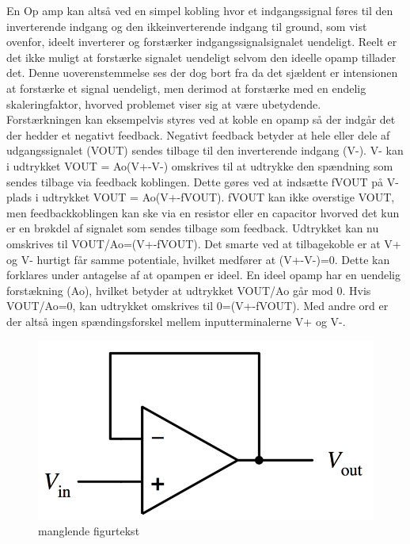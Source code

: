 %
En Op amp kan altså ved en simpel kobling hvor et indgangssignal føres til den inverterende indgang og den ikkeinverterende indgang til ground, som vist ovenfor, ideelt inverterer og forstærker indgangssignalsignalet uendeligt. Reelt er det ikke muligt at forstærke signalet uendeligt selvom den ideelle opamp tillader det. Denne uoverenstemmelse ses der dog bort fra da det sjældent er intensionen at forstærke et  signal uendeligt, men derimod at forstærke med en endelig skaleringfaktor, hvorved problemet viser sig at være ubetydende.\\
%
Forstærkningen kan eksempelvis styres ved at koble en opamp så der indgår det der hedder et negativt feedback. Negativt feedback betyder at hele eller dele af udgangssignalet (VOUT) sendes tilbage til den inverterende indgang (V-). V- kan i udtrykket VOUT = Ao(V+-V-) omskrives til at udtrykke den spændning som sendes tilbage via feedback koblingen. Dette gøres ved at indsætte fVOUT på V- plads i udtrykket VOUT = Ao(V+-fVOUT). fVOUT  kan ikke overstige VOUT, men feedbackkoblingen kan ske via en resistor eller en capacitor hvorved det kun er en brøkdel af signalet som sendes tilbage som feedback. Udtrykket kan nu omskrives til VOUT/Ao=(V+-fVOUT). Det smarte ved at tilbagekoble er at V+ og V- hurtigt får samme potentiale, hvilket medfører at (V+-V-)=0. Dette kan forklares under antagelse af at opampen er ideel. En ideel opamp har en uendelig forstækning (Ao), hvilket betyder at udtrykket VOUT/Ao går mod 0. Hvis VOUT/Ao=0, kan udtrykket omskrives til 0=(V+-fVOUT). Med andre ord er der altså ingen spændingsforskel mellem inputterminalerne V+ og V-.
%
\begin{figure}[H]
\centering
\includegraphics[resolution=300,width=\textwidth/2]{Figure/Introduktion/TilbagekoblingOpAmp.png}
\caption{manglende figurtekst}
\label{fig:TilbagekoblingOpAmp}
\end{figure}
